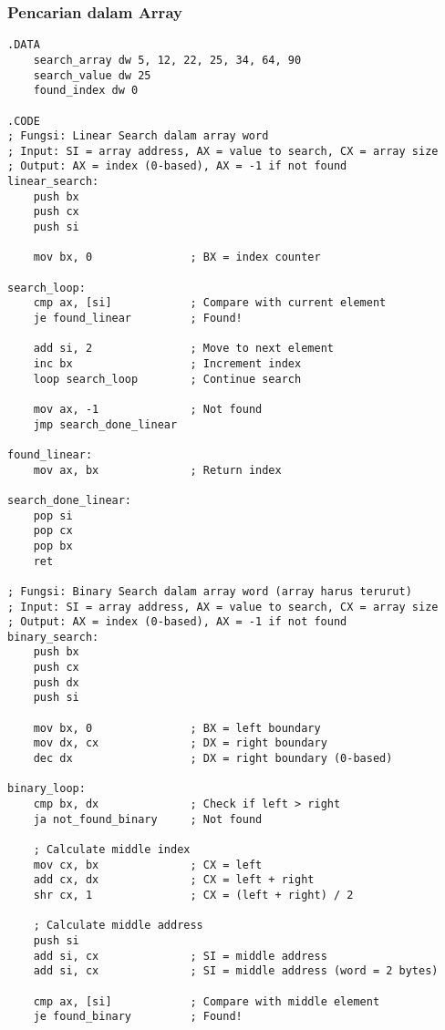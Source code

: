 \documentclass[../main.tex]{subfiles}
\begin{document}
            \subsubsection{Pencarian dalam Array}
                \begin{lstlisting}[language={[x86masm]Assembler}, caption=Pencarian dalam Array, label={lst:array-search}]
.DATA
    search_array dw 5, 12, 22, 25, 34, 64, 90
    search_value dw 25
    found_index dw 0

.CODE
; Fungsi: Linear Search dalam array word
; Input: SI = array address, AX = value to search, CX = array size
; Output: AX = index (0-based), AX = -1 if not found
linear_search:
    push bx
    push cx
    push si
    
    mov bx, 0               ; BX = index counter
    
search_loop:
    cmp ax, [si]            ; Compare with current element
    je found_linear         ; Found!
    
    add si, 2               ; Move to next element
    inc bx                  ; Increment index
    loop search_loop        ; Continue search
    
    mov ax, -1              ; Not found
    jmp search_done_linear
    
found_linear:
    mov ax, bx              ; Return index
    
search_done_linear:
    pop si
    pop cx
    pop bx
    ret

; Fungsi: Binary Search dalam array word (array harus terurut)
; Input: SI = array address, AX = value to search, CX = array size
; Output: AX = index (0-based), AX = -1 if not found
binary_search:
    push bx
    push cx
    push dx
    push si
    
    mov bx, 0               ; BX = left boundary
    mov dx, cx              ; DX = right boundary
    dec dx                  ; DX = right boundary (0-based)
    
binary_loop:
    cmp bx, dx              ; Check if left > right
    ja not_found_binary     ; Not found
    
    ; Calculate middle index
    mov cx, bx              ; CX = left
    add cx, dx              ; CX = left + right
    shr cx, 1               ; CX = (left + right) / 2
    
    ; Calculate middle address
    push si
    add si, cx              ; SI = middle address
    add si, cx              ; SI = middle address (word = 2 bytes)
    
    cmp ax, [si]            ; Compare with middle element
    je found_binary         ; Found!
    

\end{lstlisting}
\end{document}
